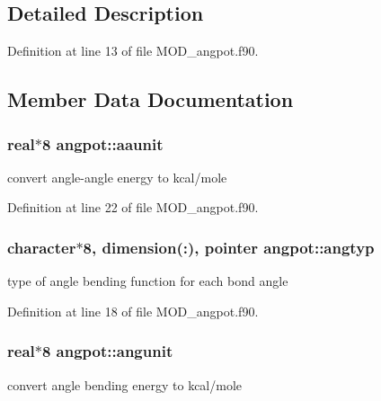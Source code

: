 \subsection{Detailed Description}


Definition at line 13 of file M\-O\-D\-\_\-angpot.\-f90.



\subsection{Member Data Documentation}
\hypertarget{classangpot_afd96d62ac3593218e061c659324c800a}{
\subsubsection[{aaunit}]{\setlength{\rightskip}{0pt plus 5cm}real$\ast$8 angpot\-::aaunit}}\label{classangpot_afd96d62ac3593218e061c659324c800a}


convert angle-\/angle energy to kcal/mole 



Definition at line 22 of file M\-O\-D\-\_\-angpot.\-f90.

\hypertarget{classangpot_a443bc09b102c6f7cd613d221d0f7a20c}{
\subsubsection[{angtyp}]{\setlength{\rightskip}{0pt plus 5cm}character$\ast$8, dimension(\-:), pointer angpot\-::angtyp}}\label{classangpot_a443bc09b102c6f7cd613d221d0f7a20c}


type of angle bending function for each bond angle 



Definition at line 18 of file M\-O\-D\-\_\-angpot.\-f90.

\hypertarget{classangpot_a5ca3f03de196f4cc44eba96deb1f865a}{
\subsubsection[{angunit}]{\setlength{\rightskip}{0pt plus 5cm}real$\ast$8 angpot\-::angunit}}\label{classangpot_a5ca3f03de196f4cc44eba96deb1f865a}


convert angle bending energy to kcal/mole 



